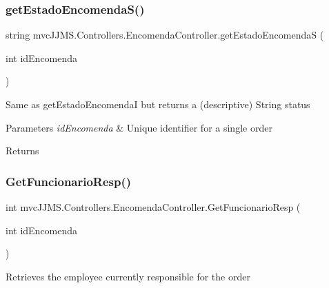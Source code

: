 \subsubsection{\texorpdfstring{get\+Estado\+Encomenda\+S()}{getEstadoEncomendaS()}}
{\footnotesize\ttfamily string mvc\+J\+J\+M\+S.\+Controllers.\+Encomenda\+Controller.\+get\+Estado\+EncomendaS (\begin{DoxyParamCaption}\item[{int}]{id\+Encomenda }\end{DoxyParamCaption})\hspace{0.3cm}{\ttfamily [inline]}}



Same as get\+Estado\+EncomendaI but returns a (descriptive) String status 


\begin{DoxyParams}{Parameters}
{\em id\+Encomenda} & Unique identifier for a single order\\
\hline
\end{DoxyParams}
\begin{DoxyReturn}{Returns}

\end{DoxyReturn}
\mbox{\label{classmvc_j_j_m_s_1_1_controllers_1_1_encomenda_controller_a29d51d82112bcd56e12b4c2ae5220f43}} 
\subsubsection{\texorpdfstring{Get\+Funcionario\+Resp()}{GetFuncionarioResp()}}
{\footnotesize\ttfamily int mvc\+J\+J\+M\+S.\+Controllers.\+Encomenda\+Controller.\+Get\+Funcionario\+Resp (\begin{DoxyParamCaption}\item[{int}]{id\+Encomenda }\end{DoxyParamCaption})\hspace{0.3cm}{\ttfamily [inline]}}



Retrieves the employee currently responsible for the order 



